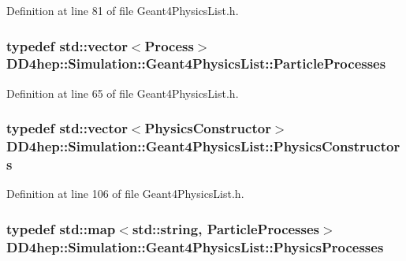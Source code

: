 Definition at line 81 of file Geant4PhysicsList.h.\hypertarget{class_d_d4hep_1_1_simulation_1_1_geant4_physics_list_adf5c4ae6ed4befac883cf5f253f4220e}{
\subsubsection[{ParticleProcesses}]{\setlength{\rightskip}{0pt plus 5cm}typedef std::vector$<${\bf Process}$>$ {\bf DD4hep::Simulation::Geant4PhysicsList::ParticleProcesses}}}
\label{class_d_d4hep_1_1_simulation_1_1_geant4_physics_list_adf5c4ae6ed4befac883cf5f253f4220e}


Definition at line 65 of file Geant4PhysicsList.h.\hypertarget{class_d_d4hep_1_1_simulation_1_1_geant4_physics_list_a5953826b626c21fa4b26ab9a07f3b8ad}{
\subsubsection[{PhysicsConstructors}]{\setlength{\rightskip}{0pt plus 5cm}typedef std::vector$<${\bf PhysicsConstructor}$>$ {\bf DD4hep::Simulation::Geant4PhysicsList::PhysicsConstructors}}}
\label{class_d_d4hep_1_1_simulation_1_1_geant4_physics_list_a5953826b626c21fa4b26ab9a07f3b8ad}


Definition at line 106 of file Geant4PhysicsList.h.\hypertarget{class_d_d4hep_1_1_simulation_1_1_geant4_physics_list_ab41e55687c9d57878fe2e6847a31f19a}{
\subsubsection[{PhysicsProcesses}]{\setlength{\rightskip}{0pt plus 5cm}typedef std::map$<$std::string, {\bf ParticleProcesses}$>$ {\bf DD4hep::Simulation::Geant4PhysicsList::PhysicsProcesses}}}
\label{class_d_d4hep_1_1_simulation_1_1_geant4_physics_list_ab41e55687c9d57878fe2e6847a31f19a}


